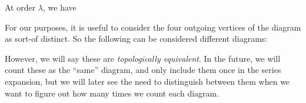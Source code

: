 \documentclass[a4paper]{article}
\begin{document}
At order $\lambda$, we have
\begin{center}
\end{center}
For our purposes, it is useful to consider the four outgoing vertices of the diagram as sort-of distinct. So the following can be considered different diagrams:
\begin{center}
  \quad
\end{center}
However, we will say these are \emph{topologically equivalent}. In the future, we will count these as the ``same'' diagram, and only include them once in the series expansion, but we will later see the need to distinguish between them when we want to figure out how many times we count each diagram.
\end{document}
